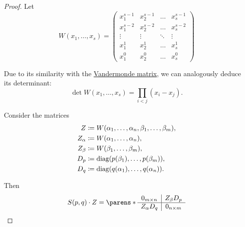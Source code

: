 \begin{proof}
  Let
  \begin{equation*}
    W(x_1, \ldots, x_s) =
    \begin{pmatrix}
      x_1^{s-1} & x_2^{s-1} & \ldots & x_s^{s-1} \\
      x_1^{s-2} & x_2^{s-2} & \ldots & x_s^{s-2} \\
      \vdots    & \vdots    & \ddots & \vdots    \\
      x_1^1     & x_2^1     & \ldots & x_s^1     \\
      x_1^0     & x_2^0     & \ldots & x_s^0
    \end{pmatrix}
  \end{equation*}

  Due to its similarity with the \hyperref[ex:vandermonde_matrix]{Vandermonde matrix}, we can analogously deduce its determinant:
  \begin{equation}\label{eq:thm:resultant_as_product/proof/w_determinant}
    \det W(x_1, \ldots, x_s) = \prod_{i < j} (x_i - x_j).
  \end{equation}

  Consider the matrices
  \begin{align*}
    Z        &\coloneqq W(\alpha_1, \ldots, \alpha_n, \beta_1, \ldots, \beta_m), \\
    Z_\alpha &\coloneqq W(\alpha_1, \ldots, \alpha_n), \\
    Z_\beta  &\coloneqq W(\beta_1, \ldots, \beta_m), \\
    D_p      &\coloneqq \op{diag}(p(\beta_1), \ldots, p(\beta_m)), \\
    D_q      &\coloneqq \op{diag}(q(\alpha_1), \ldots, q(\alpha_n)).
  \end{align*}

  Then
  \begin{equation}\label{eq:thm:resultant_as_product/proof/matrix_product}
    S(p, q) \cdot Z =
    \parens*
      {
        \begin{array}{c | c}
          0_{m \times n} & Z_\beta D_p   \\
          \hline
          Z_\alpha D_q   & 0_{n \times m}
        \end{array}
      }
  \end{equation}


\end{proof}
